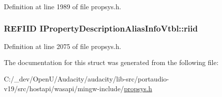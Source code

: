 Definition at line 1989 of file propsys.\+h.

\subsubsection[{\texorpdfstring{riid}{riid}}]{ {\bf R\+E\+F\+I\+ID} I\+Property\+Description\+Alias\+Info\+Vtbl\+::riid}\hypertarget{struct_i_property_description_alias_info_vtbl_acd5119da80a0798a859a39662d6d0d6d}{}\label{struct_i_property_description_alias_info_vtbl_acd5119da80a0798a859a39662d6d0d6d}


Definition at line 2075 of file propsys.\+h.



The documentation for this struct was generated from the following file\+:\begin{DoxyCompactItemize}
\item 
C\+:/\+\_\+dev/\+Open\+U/\+Audacity/audacity/lib-\/src/portaudio-\/v19/src/hostapi/wasapi/mingw-\/include/\hyperlink{propsys_8h}{propsys.\+h}\end{DoxyCompactItemize}
